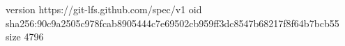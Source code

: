version https://git-lfs.github.com/spec/v1
oid sha256:90c9a2505c978fcab8905444c7e69502cb959ff3dc8547b68217f8f64b7bcb55
size 4796
